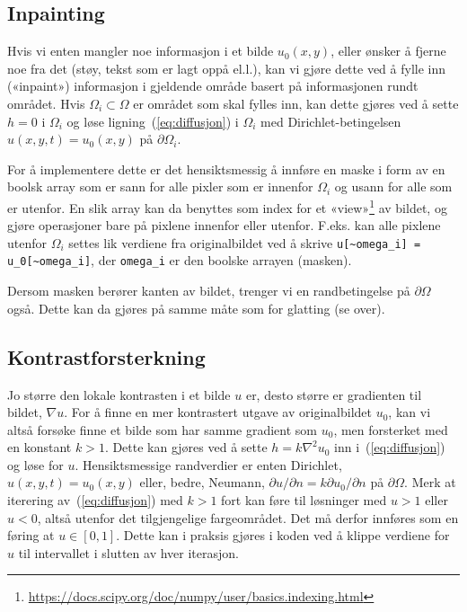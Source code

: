 \documentclass[11pt,a4paper]{article}
\begin{document}
\subsection{Inpainting}
\label{sec:inpainting}

Hvis vi enten mangler noe informasjon i et bilde $u_0(x, y)$, eller ønsker å fjerne noe fra det (støy, tekst som er lagt oppå el.l.), kan vi gjøre dette ved å fylle inn («inpaint») informasjon i gjeldende område basert på informasjonen rundt området. Hvis $\Omega_i \subset \Omega$ er området som skal fylles inn, kan dette gjøres ved å sette $h = 0$ i $\Omega_i$ og løse ligning~(\ref{eq:diffusjon}) i $\Omega_i$ med Dirichlet-betingelsen $u(x, y, t) = u_0(x, y)$ på $\partial\Omega_i$.

For å implementere dette er det hensiktsmessig å innføre en maske i form av en boolsk array som er sann for alle pixler som er innenfor $\Omega_i$ og usann for alle som er utenfor. En slik array kan da benyttes som index for et «view»\footnote{\url{https://docs.scipy.org/doc/numpy/user/basics.indexing.html}} av bildet, og gjøre operasjoner bare på pixlene innenfor eller utenfor. F.eks. kan alle pixlene utenfor $\Omega_i$ settes lik verdiene fra originalbildet ved å skrive \texttt{u[\textasciitilde   omega\_i] = u\_0[\textasciitilde omega\_i]}, der \texttt{omega\_i} er den boolske arrayen (masken).

Dersom masken berører kanten av bildet, trenger vi en randbetingelse på $\partial\Omega$ også. Dette kan da gjøres på samme måte som for glatting (se over).

\subsection{Kontrastforsterkning}
\label{sec:kontrastforsterkning}

Jo større den lokale kontrasten i et bilde $u$ er, desto større er gradienten til bildet, $\nabla u$. For å finne en mer kontrastert utgave av originalbildet $u_0$, kan vi altså forsøke finne et bilde som har samme gradient som $u_0$, men forsterket med en konstant $k > 1$. Dette kan gjøres ved å sette $h = k\nabla^2 u_0$ inn i~(\ref{eq:diffusjon}) og løse for $u$. Hensiktsmessige randverdier er enten Dirichlet, $u(x, y, t) = u_0(x, y)$ eller, bedre, Neumann, $\partial u/\partial n = k\partial u_0/\partial n$ på $\partial\Omega$. Merk at iterering av~(\ref{eq:diffusjon}) med $k > 1$ fort kan føre til løsninger med $u > 1$ eller $u < 0$, altså utenfor det tilgjengelige fargeområdet. Det må derfor innføres som en føring at $u \in [0, 1]$. Dette kan i praksis gjøres i koden ved å klippe verdiene for $u$ til intervallet i slutten av hver iterasjon.
\end{document}
